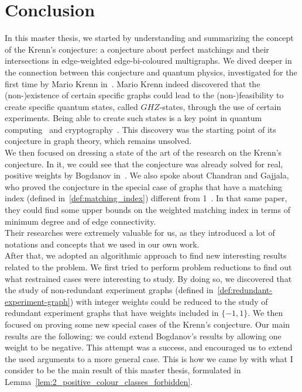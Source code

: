 \setcounter{secnumdepth}{-1}

\chapter{Conclusion}
\label{ch:conclusion}

In this master thesis, we started by understanding and summarizing the concept of the Krenn's conjecture: a conjecture about perfect matchings and their intersections in edge-weighted edge-bi-coloured multigraphs.\cite{wordpress}
We dived deeper in the connection between this conjecture and quantum physics, investigated for the first time by Mario Krenn in~\cite{Krenn_2017}.
Mario Krenn indeed discovered that the (non-)existence of certain specific graphs could lead to the (non-)feasibility to create specific quantum states, called $GHZ$-states, through the use of certain experiments.
Being able to create such states is a key point in quantum computing~\cite{gu2020compact} and cryptography~\cite{pivoluska2018layered}.
This discovery was the starting point of its conjecture in graph theory, which remains unsolved.\\

We then focused on dressing a state of the art of the research on the Krenn's conjecture.
In it, we could see that the conjecture was already solved for real, positive weights by Bogdanov in~\cite{bogdanov}.
We also spoke about Chandran and Gajjala, who proved the conjecture in the special case of graphs that have a matching index (defined in~\ref{def:matching_index}) different from 1~\cite{chandran}.
In that same paper, they could find some upper bounds on the weighted matching index in terms of minimum degree and of edge connectivity.\\
Their researches were extremely valuable for us, as they introduced a lot of notations and concepts that we used in our own work.\\

After that, we adopted an algorithmic approach to find new interesting results related to the problem.
We first tried to perform problem reductions to find out what restrained cases were interesting to study.
By doing so, we discovered that the study of non-redundant experiment graphs (defined in~\ref{def:redundant-experiment-graph}) with integer weights could be reduced to the study of redundant experiment graphs that have weights included in $\{-1, 1\}$.
We then focused on proving some new special cases of the Krenn's conjecture.
Our main results are the following: we could extend Bogdanov's results\cite{bogdanov} by allowing one weight to be negative.
This attempt was a success, and encouraged us to extend the used arguments to a more general case.
This is how we came by with what I consider to be the main result of this master thesis, formulated in Lemma~\ref{lem:2_positive_colour_classes_forbidden}.

